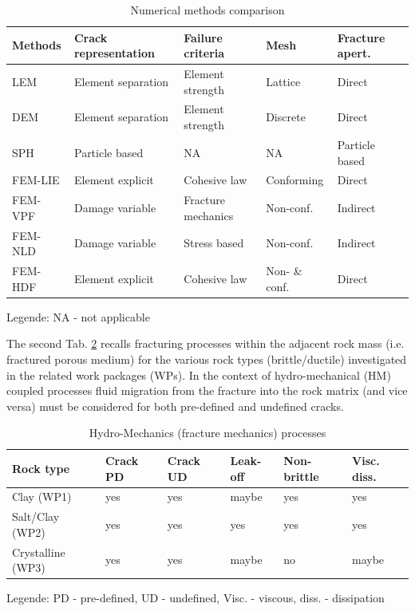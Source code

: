 \begin{table}[h!]
\centering
\caption{Numerical methods comparison}
\label{tab:num-comp}
\footnotesize
\begin{tabular}{lllll}
\hline
Methods & Crack representation & Failure criteria   & Mesh & Fracture apert. \\
\hline
LEM     & Element separation   & Element strength   & Lattice        & Direct \\
DEM     & Element separation   & Element strength   & Discrete       & Direct \\
SPH     & Particle based       & NA                 & NA             & Particle based \\
FEM-LIE & Element explicit     & Cohesive law       & Conforming     & Direct \\
FEM-VPF & Damage variable      & Fracture mechanics & Non-conf.      & Indirect \\
FEM-NLD & Damage variable      & Stress based       & Non-conf.      & Indirect \\
FEM-HDF & Element explicit     & Cohesive law       & Non- \& conf.  & Direct  \\
\hline
\end{tabular}
\end{table}
\vspace{-5mm}
\tiny Legende: NA - not applicable
\normalsize

The second Tab. \ref{tab:hm-processes} recalls fracturing processes within the adjacent rock mass (i.e. fractured porous medium) for the various rock types (brittle/ductile) investigated in the related work packages (WPs). In the context of hydro-mechanical (HM) coupled processes fluid migration from the fracture into the rock matrix (and vice versa) must be considered for both pre-defined and undefined cracks.

\clearpage

\begin{table}[h!]
\centering
\caption{Hydro-Mechanics (fracture mechanics) processes}
\label{tab:hm-processes}
\footnotesize
\begin{tabular}{llllll}
\hline
Rock type         & Crack PD & Crack UD & Leak-off & Non-brittle & Visc. diss.\\
\hline
Clay (WP1)        & yes & yes & maybe & yes & yes \\
Salt/Clay (WP2)   & yes & yes & yes   & yes & yes \\
Crystalline (WP3) & yes & yes & maybe & no  & maybe \\
\hline
\end{tabular}
\end{table}
\vspace{-5mm}
\tiny Legende: PD - pre-defined, UD - undefined, Visc. - viscous, diss. - dissipation
\normalsize

